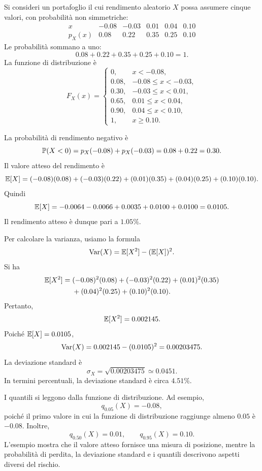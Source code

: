\begin{example}
Si consideri un portafoglio il cui rendimento aleatorio $X$ possa assumere cinque
valori, con probabilit\`{a} non simmetriche:
\[
\begin{array}{c|ccccc}
x & -0.08 & -0.03 & 0.01 & 0.04 & 0.10\\
\hline
p_X(x) & 0.08 & 0.22 & 0.35 & 0.25 & 0.10
\end{array}
\]
Le probabilit\`{a} sommano a uno:
\[
0.08+0.22+0.35+0.25+0.10=1.
\]
La funzione di distribuzione \`{e}
\[
F_X(x)=
\begin{cases}
0, & x<-0.08,\\
0.08, & -0.08\leq x<-0.03,\\
0.30, & -0.03\leq x<0.01,\\
0.65, & 0.01\leq x<0.04,\\
0.90, & 0.04\leq x<0.10,\\
1, & x\geq 0.10.
\end{cases}
\]

La probabilit\`{a} di rendimento negativo \`{e}
\[
\mathbb{P}(X<0)
=
p_X(-0.08)+p_X(-0.03)
=
0.08+0.22
=
0.30.
\]
Il valore atteso del rendimento \`{e}
\[
\mathbb{E}[X]
=
(-0.08)(0.08)+(-0.03)(0.22)+(0.01)(0.35)
+(0.04)(0.25)+(0.10)(0.10).
\]
Quindi
\[
\mathbb{E}[X]
=
-0.0064-0.0066+0.0035+0.0100+0.0100
=
0.0105.
\]
Il rendimento atteso \`{e} dunque pari a $1.05\%$.

Per calcolare la varianza, usiamo la formula
\[
\operatorname{Var}(X)=\mathbb{E}[X^2]-(\mathbb{E}[X])^2.
\]
Si ha
\[
\begin{aligned}
\mathbb{E}[X^2]
={}&(-0.08)^2(0.08)+(-0.03)^2(0.22)+(0.01)^2(0.35)\\
&+(0.04)^2(0.25)+(0.10)^2(0.10).
\end{aligned}
\]
Pertanto,
\[
\mathbb{E}[X^2]=0.002145.
\]
Poich\'{e} $\mathbb{E}[X]=0.0105$,
\[
\operatorname{Var}(X)
=
0.002145-(0.0105)^2
=
0.00203475.
\]
La deviazione standard \`{e}
\[
\sigma_X
=
\sqrt{0.00203475}
\simeq
0.0451.
\]
In termini percentuali, la deviazione standard \`{e} circa $4.51\%$.

I quantili si leggono dalla funzione di distribuzione. Ad esempio,
\[
q_{0.05}(X)=-0.08,
\]
poich\'{e} il primo valore in cui la funzione di distribuzione raggiunge almeno
$0.05$ \`{e} $-0.08$. Inoltre,
\[
q_{0.50}(X)=0.01,
\qquad
q_{0.95}(X)=0.10.
\]
L'esempio mostra che il valore atteso fornisce una misura di posizione, mentre
la probabilit\`{a} di perdita, la deviazione standard e i quantili descrivono
aspetti diversi del rischio.
\end{example}

